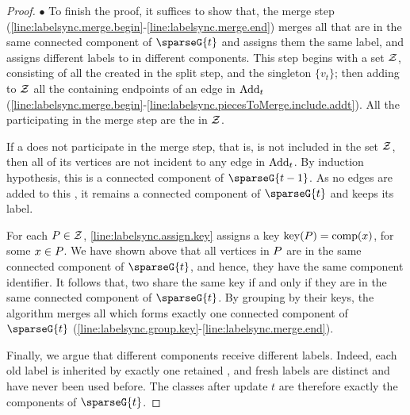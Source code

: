 \begin{proof}
    $ \bullet $ To finish the proof, it suffices to show that, the merge step (\cref{line:labelsync.merge.begin}-\cref{line:labelsync.merge.end}) merges all  that are in the same connected component of $ \sparseG{t} $ and assigns them the same label, and assigns different labels to  in different components. 
    This step begins with a set $ \mathcal{Z} $, consisting of all the  created in the split step, and the singleton $ \{v_t\} $; then adding to $ \mathcal{Z} $ all the  containing endpoints of an edge in $ \mathrm{Add}_{t} $ (\cref{line:labelsync.merge.begin}-\cref{line:labelsync.piecesToMerge.include.addt}).
    All the  participating in the merge step are the  in $ \mathcal{Z} $.

    If a \piece{} does not participate in the merge step, that is, is not included in the set $ \mathcal{Z} $, then all of its vertices are not incident to any edge in $ \mathrm{Add}_{t} $.
    By induction hypothesis, this \piece{} is a connected component of $ \sparseG{t-1} $.
    As no edges are added to this \piece{}, it remains a connected component of $ \sparseG{t} $ and keeps its label.

    For each \piece{} $ P \in \mathcal{Z} $, \cref{line:labelsync.assign.key} assigns a key $ \mathrm{key}(P) = \mathrm{comp}(x) $, for some $ x \in P $.
    We have shown above that all vertices in $ P $ are in the same connected component of $ \sparseG{t} $, and hence, they have the same component identifier.
    It follows that, two  share the same key if and only if they are in the same connected component of $ \sparseG{t} $.
    By grouping  by their keys, the algorithm merges all  which forms exactly one connected component of $ \sparseG{t} $ (\cref{line:labelsync.group.key}-\cref{line:labelsync.merge.end}).

    Finally, we argue that different components receive different labels. Indeed, each old label is inherited by exactly one retained \piece{}, and fresh labels are distinct and have never been used before.
    The classes after update $ t $ are therefore exactly the components of $ \sparseG{t} $.
\end{proof}


